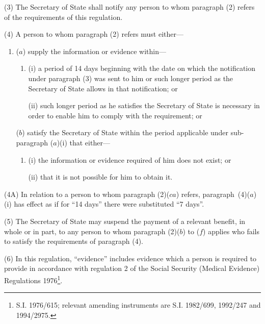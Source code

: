 \documentclass[12pt,a4paper]{article}
\begin{document}
(3) The Secretary of State shall notify any person to whom paragraph (2) refers of the requirements of this regulation.

(4) A person to whom paragraph (2) refers must either—
\begin{enumerate}\item[]
($a$) supply the information or evidence within—
\begin{enumerate}\item[]

(i) a period of 14 days beginning with the date on which the notification under paragraph (3) was sent to him or such longer period as the Secretary of State allows in that notification; or

(ii) such longer period as he satisfies the Secretary of State is necessary in order to enable him to comply with the requirement; or
\end{enumerate}

($b$) satisfy the Secretary of State within the 
period applicable under  %
sub-paragraph ($a$)(i) that either—
\begin{enumerate}\item[]
(i) the information or evidence required of him does not exist; or

(ii) that it is not possible for him to obtain it.
\end{enumerate}
\end{enumerate}

(4A) In relation to a person to whom paragraph (2)($ca$) refers, paragraph~(4)($a$)(i) has effect as if for “14 days” there were substituted “7 days”.

(5) The Secretary of State may suspend the payment of a relevant benefit, in whole or in part, to any person to whom paragraph (2)($b$) to 
($f$)  %
applies who fails to satisfy the requirements of paragraph (4).

(6) In this regulation, “evidence” includes evidence which a person is required to provide in accordance with regulation 2 of the Social Security (Medical Evidence) Regulations 1976\footnote{\frenchspacing S.I. 1976/615; relevant amending instruments are S.I. 1982/699, 1992/247 and 1994/2975.}.
\end{document}
